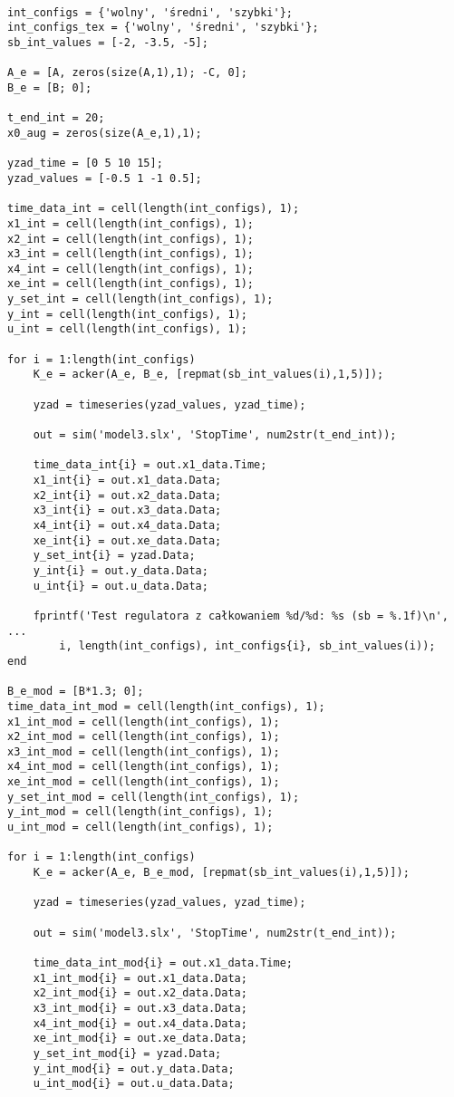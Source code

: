 \documentclass[a4paper,titlepage,11pt,floatssmall]{mwrep} %
\begin{document}
\begin{lstlisting}[style=custommatlab, caption={Pełny kod skryptu \texttt{combined\_plots.m}.}, label={lst:init_full}]
%% Zadanie dodatkowe

int_configs = {'wolny', 'średni', 'szybki'};
int_configs_tex = {'wolny', 'średni', 'szybki'};
sb_int_values = [-2, -3.5, -5];

A_e = [A, zeros(size(A,1),1); -C, 0];
B_e = [B; 0];

t_end_int = 20;
x0_aug = zeros(size(A_e,1),1);

yzad_time = [0 5 10 15];
yzad_values = [-0.5 1 -1 0.5];

time_data_int = cell(length(int_configs), 1);
x1_int = cell(length(int_configs), 1);
x2_int = cell(length(int_configs), 1);
x3_int = cell(length(int_configs), 1);
x4_int = cell(length(int_configs), 1);
xe_int = cell(length(int_configs), 1);
y_set_int = cell(length(int_configs), 1);
y_int = cell(length(int_configs), 1);
u_int = cell(length(int_configs), 1);

for i = 1:length(int_configs)
    K_e = acker(A_e, B_e, [repmat(sb_int_values(i),1,5)]);

    yzad = timeseries(yzad_values, yzad_time);

    out = sim('model3.slx', 'StopTime', num2str(t_end_int));

    time_data_int{i} = out.x1_data.Time;
    x1_int{i} = out.x1_data.Data;
    x2_int{i} = out.x2_data.Data;
    x3_int{i} = out.x3_data.Data;
    x4_int{i} = out.x4_data.Data;
    xe_int{i} = out.xe_data.Data;
    y_set_int{i} = yzad.Data;
    y_int{i} = out.y_data.Data;
    u_int{i} = out.u_data.Data;

    fprintf('Test regulatora z całkowaniem %d/%d: %s (sb = %.1f)\n', ...
        i, length(int_configs), int_configs{i}, sb_int_values(i));
end

B_e_mod = [B*1.3; 0];
time_data_int_mod = cell(length(int_configs), 1);
x1_int_mod = cell(length(int_configs), 1);
x2_int_mod = cell(length(int_configs), 1);
x3_int_mod = cell(length(int_configs), 1);
x4_int_mod = cell(length(int_configs), 1);
xe_int_mod = cell(length(int_configs), 1);
y_set_int_mod = cell(length(int_configs), 1);
y_int_mod = cell(length(int_configs), 1);
u_int_mod = cell(length(int_configs), 1);

for i = 1:length(int_configs)
    K_e = acker(A_e, B_e_mod, [repmat(sb_int_values(i),1,5)]);

    yzad = timeseries(yzad_values, yzad_time);

    out = sim('model3.slx', 'StopTime', num2str(t_end_int));

    time_data_int_mod{i} = out.x1_data.Time;
    x1_int_mod{i} = out.x1_data.Data;
    x2_int_mod{i} = out.x2_data.Data;
    x3_int_mod{i} = out.x3_data.Data;
    x4_int_mod{i} = out.x4_data.Data;
    xe_int_mod{i} = out.xe_data.Data;
    y_set_int_mod{i} = yzad.Data;
    y_int_mod{i} = out.y_data.Data;
    u_int_mod{i} = out.u_data.Data;


\end{lstlisting}
\end{document}
